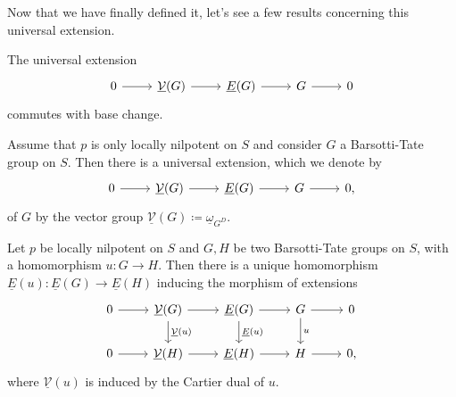 \noindent
Now that we have finally defined it, let's see
a few results concerning this universal extension.


\begin{lem}
	The universal extension 
	\begin{equation*}
	\begin{tikzcd}
		0 \arrow[r, "", rightarrow] &
		\underline{\mathcal{V}}(G) \arrow[r, "", rightarrow] &
		\underline{E}(G) \arrow[r, "", rightarrow] &
		G \arrow[r, "", rightarrow] &
		0
	\end{tikzcd}
	\end{equation*}
	commutes with base change.
\end{lem} 


\begin{lem}
	Assume that $p$ is only locally nilpotent on $S$
	and consider $G$ a Barsotti-Tate group on $S$.
	Then there is a universal extension, which we denote by
	\begin{equation*}
	\begin{tikzcd}
		0 \arrow[r, "", rightarrow] &
		\underline{\mathcal{V}}(G) \arrow[r, "", rightarrow] &
		\underline{E}(G) \arrow[r, "", rightarrow] &
		G \arrow[r, "", rightarrow] &
		0
	,\end{tikzcd}
	\end{equation*}
	of $G$ by the vector group
	$\underline{\mathcal{V}}(G) \coloneqq \underline{\omega}_{G^D}$.
\end{lem} 


\begin{prop}\label{prop:MorUnivExts}
	Let $p$ be locally nilpotent on $S$ and $G,H$ be two
	Barsotti-Tate groups on $S$, with a homomorphism $u\colon G \to H$.
	Then there is a unique homomorphism
	$\underline{E}(u)\colon \underline{E}(G) \to \underline{E}(H)$ inducing the morphism of extensions
	\begin{equation*}
	\begin{tikzcd}
		0 \arrow[r, "", rightarrow] &
		\underline{\mathcal{V}}(G) \arrow[r, "", rightarrow] 
		\arrow[d, "\underline{\mathcal{V}}(u)", rightarrow] &
		\underline{E}(G) \arrow[r, "", rightarrow] 
		\arrow[d, "\underline{E}(u)", rightarrow] &
		G \arrow[r, "", rightarrow] 
		\arrow[d, "u", rightarrow] &
		0\\
		0 \arrow[r, "", rightarrow] &
		\underline{\mathcal{V}}(H) \arrow[r, "", rightarrow] &
		\underline{E}(H) \arrow[r, "", rightarrow] &
		H \arrow[r, "", rightarrow] &
		0
	,\end{tikzcd}
	\end{equation*}
	where $\underline{\mathcal{V}}(u)$ is induced by the Cartier dual of $u$.
\end{prop} 



